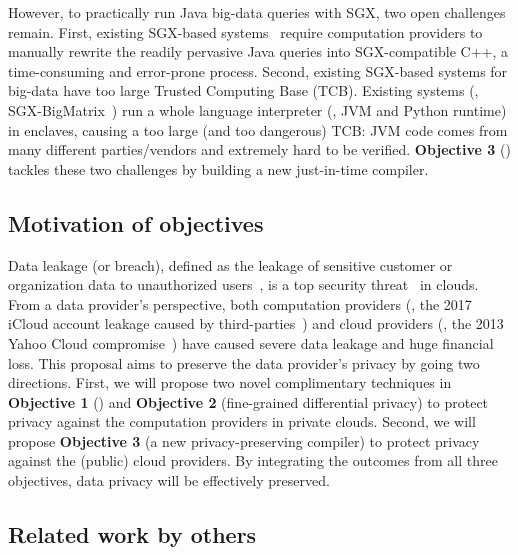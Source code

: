 However, to practically run Java big-data queries with SGX, two open challenges 
remain. First, existing SGX-based systems~\cite{opaque:nsdi17} require 
computation providers to manually rewrite the readily pervasive Java 
queries into SGX-compatible C++, a time-consuming and error-prone process.
Second, existing SGX-based systems for big-data have too large Trusted 
Computing Base (TCB). Existing systems 
(\eg, SGX-BigMatrix~\cite{bigmatrix:ccs17}) run a whole language interpreter 
(\eg, JVM and Python runtime) in enclaves, causing a too large (and too 
dangerous) TCB: JVM code comes from many different parties/vendors and 
extremely hard to be verified. \textbf{Objective 3} () tackles
these two challenges by building a new just-in-time compiler.

\vspace{-.15in}\subsection{Motivation of objectives} 
\label{sec:motivation}\vspace{-.075in}


Data leakage (or breach), defined as the leakage of sensitive customer or 
organization data to unauthorized users~\cite{kazim2015survey}, is a top 
security threat~\cite{top-threats,privacy:bigdata:rand} in clouds. 
From 
a data provider's perspective, both computation providers (\eg, the 2017 iCloud 
account leakage caused by third-parties~\cite{icloud-breach}) and cloud 
providers (\eg, the 2013 Yahoo Cloud compromise~\cite{yahoo-dropbox-breach}) 
have caused severe data leakage and huge financial loss. This proposal aims to 
preserve the data provider's privacy by going two directions. First, we will 
propose two novel complimentary techniques in \textbf{Objective 1} (\kakute) and 
\textbf{Objective 2} (fine-grained differential privacy) to protect privacy 
against the computation providers in private clouds. Second, we will propose 
\textbf{Objective 3} (a new privacy-preserving compiler) to protect privacy 
against the (public) cloud providers. By integrating the outcomes from all three 
objectives, data privacy will be effectively preserved.

\vspace{-.15in}\subsection{Related work by others} 
\label{sec:others-work}\vspace{-.075in}

